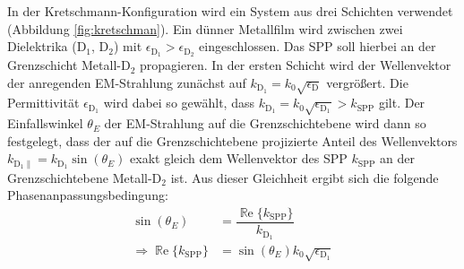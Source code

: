 \documentclass[a4paper, titlepage,  ngerman]{book}
\renewcommand{\Re}{\operatorname{\mathbb{R}e}}
\begin{document}
	In der Kretschmann-Konfiguration wird ein System aus drei Schichten verwendet (Abbildung \ref{fig:kretschman}). Ein dünner Metallfilm wird zwischen zwei Dielektrika ($\mathrm{D}_1$, $\mathrm{D}_2$) mit $\epsilon_{\mathrm{D}_1} > \epsilon_{\mathrm{D}_2}$ eingeschlossen. Das SPP soll hierbei an der Grenzschicht Metall-$\mathrm{D}_2$ propagieren. In der ersten Schicht wird der Wellenvektor der anregenden EM-Strahlung zunächst auf $k_\mathrm{\mathrm{D}_1} = k_0 \sqrt{\epsilon_\mathrm{D}}$ vergrößert. Die Permittivität $\epsilon_{\mathrm{D}_1}$ wird dabei so gewählt, dass $k_\mathrm{\mathrm{D}_1} = k_0 \sqrt{\epsilon_{\mathrm{D}_1}} > k_\mathrm{SPP}$ gilt. Der Einfallswinkel $\theta_E$ der EM-Strahlung auf die Grenzschichtebene wird dann so festgelegt, dass der auf die Grenzschichtebene projizierte Anteil des Wellenvektors $k_{\mathrm{\mathrm{D}_1}\parallel} = k_{\mathrm{\mathrm{D}_1}} \sin(\theta_E)$ exakt gleich dem Wellenvektor des SPP $k_\mathrm{SPP}$ an der Grenzschichtebene Metall-$\mathrm{D}_2$ ist. Aus dieser Gleichheit ergibt sich die folgende Phasenanpassungsbedingung: 
	\begin{align}
		\label{eq:phase_condition_kretschmann}
		\sin(\theta_E) &= \dfrac{\Re\{k_{\mathrm{SPP}}\}}{k_{\mathrm{D}_1}}\\
		\Rightarrow \Re\{k_{\mathrm{SPP}}\} &= \sin(\theta_E) k_0 \sqrt{\epsilon_{\mathrm{D}_1}}
	\end{align}  
\end{document}
